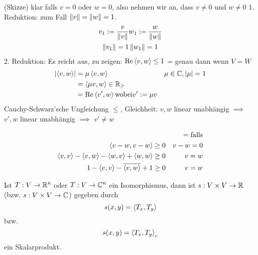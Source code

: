 \begin{Bew}
  (Skizze) klar falls $v=0$ oder $w=0$, also nehmen wir an, dass $v\neq 0$ und $w\neq 0$
  1. Reduktion: zum Fall $\left\| v \right\|=\left\| w \right\|=1$.
  \begin{align*}
    v_1:=\frac{v}{\left\| v \right\|} & w_1:=\frac{w}{\left\| w \right\|}\\
    \left\| v_1 \right\|=1 & \left\| w_1 \right\|=1
  \end{align*}
  2. Reduktion:  Es reicht aus, zu zeigen: $\operatorname{Re} \left\langle v,w \right\rangle\leq 1$ = genau dann wenn $V=W$
  \begin{align*}
    \left| \left\langle v,w \right\rangle \right|&= \mu\left\langle v,w \right\rangle & \mu\in \mathbb{C}, \left| \mu \right|=1 \\
    &= \left\langle \mu v,w \right\rangle\in \mathbb{R}_\geq \\
    &= \operatorname{Re} \left\langle v',w \right\rangle \text{wobei} v':=\mu v
  \end{align*}
  Cauchy-Schwarz'sche Ungleichung $\leq$, Gleichheit: $v,w$ linear unabhängig $\implies$ $v',w$ linear unabhängig $\implies$ $v'\neq w$
\end{Bew}
\begin{Eig}
  \begin{align*}
     && = \text{falls} \\
    \left\langle v-w,v-w \right\rangle \geq 0 && v-w=0\\
    \left\langle v,v \right\rangle - \left\langle v,w \right\rangle - \left\langle w,v \right\rangle + \left\langle w,w \right\rangle \geq 0& & v=w\\
    1-\left\langle v,v \right\rangle-\overline{\left\langle v,w \right\rangle} + 1 \geq 0 && v=w
  \end{align*}
\end{Eig}
\begin{Bsp}
  Ist $T:V\to\mathbb{R}^n$ oder $T:V\to\mathbb{C}^n$ ein Isomorphismus, dann ist $s:V\times V\to\mathbb{R}$ (bzw. $s:V\times V\to\mathbb{C}$) gegeben durch
  \[s(x,y)=\left\langle T_x,T_y \right\rangle\]
  bzw.
  \[s(x,y)=\left\langle T_x,T_y \right\rangle_c\]
  ein Skalarprodukt.
\end{Bsp}
